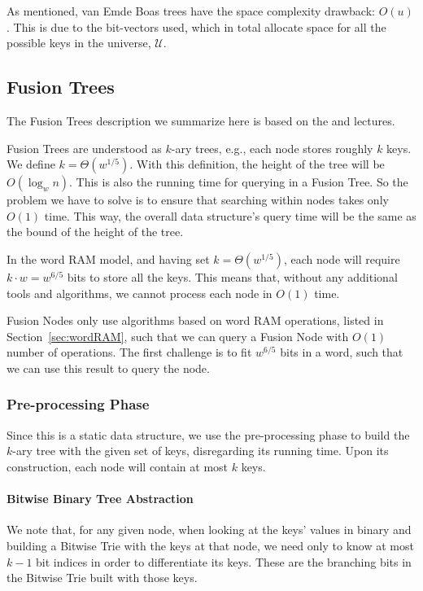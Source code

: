 As mentioned, van Emde Boas trees have the space complexity drawback: $O(u)$.
This is due to the bit-vectors used, which in total allocate space for all the possible keys in the universe, $\mathcal U$.

\subsection{Fusion Trees}

The Fusion Trees description we summarize here is based on the \cite{nelsonjelanilec2} and \cite{erikdemainelec12} lectures.

Fusion Trees are understood as $k$-ary trees, e.g., each node stores roughly $k$ keys.
We define $k = \Theta(w^{1/5})$.
With this definition, the height of the tree will be $O(\log_w n)$.
This is also the running time for querying in a Fusion Tree.
So the problem we have to solve is to ensure that searching within nodes takes only $O(1)$ time.
This way, the overall data structure's query time will be the same as the bound of the height of the tree.

In the word RAM model, and having set $k = \Theta(w^{1/5})$, each node will require $k \cdot w = w^{6/5}$ bits to store all the keys.
This means that, without any additional tools and algorithms, we cannot process each node in $O(1)$ time.

Fusion Nodes only use algorithms based on word RAM operations, listed in Section~\ref{sec:wordRAM}, such that we can query a Fusion Node with $O(1)$ number of operations.
The first challenge is to fit $w^{6/5}$ bits in a word, such that we can use this result to query the node.

\subsubsection{Pre-processing Phase}

Since this is a static data structure, we use the pre-processing phase to build the $k$-ary tree with the given set of keys, disregarding its running time.
Upon its construction, each node will contain at most $k$ keys.

\paragraph*{Bitwise Binary Tree Abstraction}\label{par:bitwiseTrieAbstraction} We note that, for any given node, when looking at the keys' values in binary and building a Bitwise Trie with the keys at that node, we need only to know at most $k - 1$ bit indices in order to differentiate its keys.
These are the branching bits in the Bitwise Trie built with those keys.


